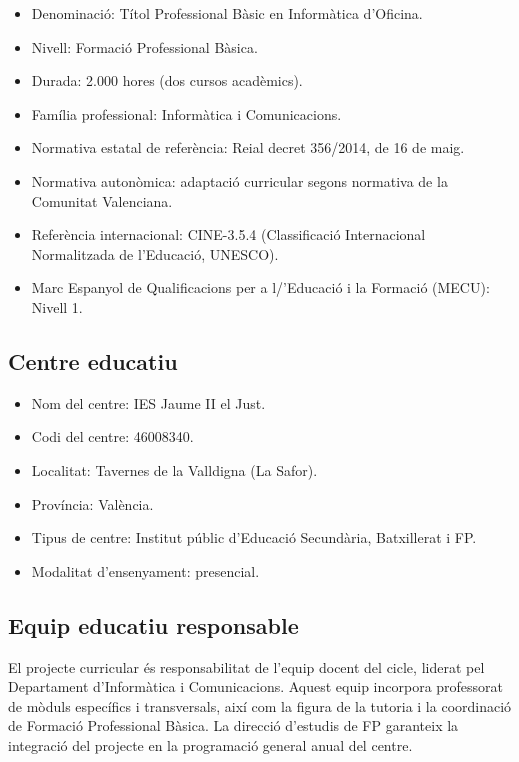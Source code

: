 \documentclass[
  paper=a4,
  ,captions=tableheading
]{scrartcl}
\providecommand{\tightlist}{%
  \setlength{\itemsep}{0pt}\setlength{\parskip}{0pt}}
\begin{document}
\begin{itemize}
\tightlist
\item
  Denominació: Títol Professional Bàsic en Informàtica d'Oficina.
\item
  Nivell: Formació Professional Bàsica.
\item
  Durada: 2.000 hores (dos cursos acadèmics).
\item
  Família professional: Informàtica i Comunicacions.
\item
  Normativa estatal de referència: Reial decret 356/2014, de 16 de maig.
\item
  Normativa autonòmica: adaptació curricular segons normativa de la
  Comunitat Valenciana.
\item
  Referència internacional: CINE-3.5.4 (Classificació Internacional
  Normalitzada de l'Educació, UNESCO).
\item
  Marc Espanyol de Qualificacions per a l/'Educació i la Formació
  (MECU): Nivell 1.
\end{itemize}

\hypertarget{centre-educatiu}{%
\subsection{Centre educatiu}\label{centre-educatiu}}

\begin{itemize}
\tightlist
\item
  Nom del centre: IES Jaume II el Just.
\item
  Codi del centre: 46008340.
\item
  Localitat: Tavernes de la Valldigna (La Safor).
\item
  Província: València.
\item
  Tipus de centre: Institut públic d'Educació Secundària, Batxillerat i
  FP.
\item
  Modalitat d'ensenyament: presencial.
\end{itemize}

\hypertarget{equip-educatiu-responsable}{%
\subsection{Equip educatiu
responsable}\label{equip-educatiu-responsable}}

El projecte curricular és responsabilitat de l'equip docent del cicle,
liderat pel Departament d'Informàtica i Comunicacions. Aquest equip
incorpora professorat de mòduls específics i transversals, així com la
figura de la tutoria i la coordinació de Formació Professional Bàsica.
La direcció d'estudis de FP garanteix la integració del projecte en la
programació general anual del centre.
\end{document}
